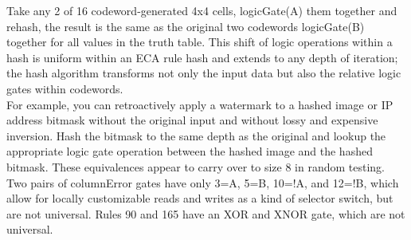 \documentclass[11pt]{article}
\begin{document}
Take any 2 of 16 codeword-generated 4x4 cells, logicGate(A) them together and rehash, the result is the same as the original two codewords logicGate(B) together for all values in the truth table. This shift of logic operations within a hash is uniform within an ECA rule hash and extends to any depth of iteration; the hash algorithm transforms not only the input data but also the relative logic gates within codewords. \\

For example, you can retroactively apply a watermark to a hashed image or IP address bitmask without the original input and without lossy and expensive inversion. Hash the bitmask to the same depth as the original and lookup the appropriate logic gate operation between the hashed image and the hashed bitmask. These equivalences appear to carry over to size 8 in random testing. Two pairs of columnError gates have only 3=A, 5=B, 10=!A, and 12=!B, which allow for locally customizable reads and writes as a kind of selector switch, but are not universal. Rules 90 and 165 have an XOR and XNOR gate, which are not universal.  \\
\newpage
\end{document}
